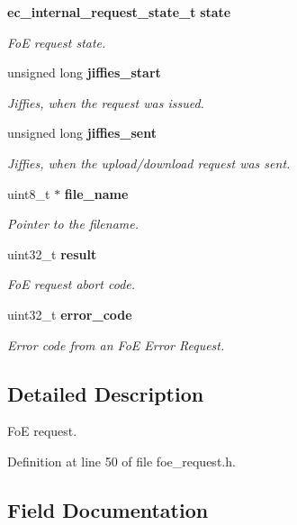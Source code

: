 \begin{DoxyCompactItemize}
{\bf ec\-\_\-internal\-\_\-request\-\_\-state\-\_\-t} {\bf state}
\begin{DoxyCompactList}\small\item\em \-Fo\-E request state. \end{DoxyCompactList}\item 
unsigned long {\bf jiffies\-\_\-start}
\begin{DoxyCompactList}\small\item\em \-Jiffies, when the request was issued. \end{DoxyCompactList}\item 
unsigned long {\bf jiffies\-\_\-sent}
\begin{DoxyCompactList}\small\item\em \-Jiffies, when the upload/download request was sent. \end{DoxyCompactList}\item 
uint8\-\_\-t $\ast$ {\bf file\-\_\-name}
\begin{DoxyCompactList}\small\item\em \-Pointer to the filename. \end{DoxyCompactList}\item 
uint32\-\_\-t {\bf result}
\begin{DoxyCompactList}\small\item\em \-Fo\-E request abort code. \end{DoxyCompactList}\item 
uint32\-\_\-t {\bf error\-\_\-code}
\begin{DoxyCompactList}\small\item\em \-Error code from an \-Fo\-E \-Error \-Request. \end{DoxyCompactList}\end{DoxyCompactItemize}


\subsection{\-Detailed \-Description}
\-Fo\-E request. 

\-Definition at line 50 of file foe\-\_\-request.\-h.



\subsection{\-Field \-Documentation}
